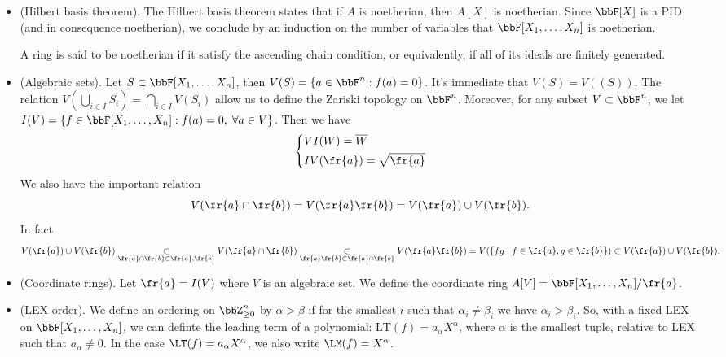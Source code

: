 \begin{itemize}
    \item(Hilbert basis theorem). The Hilbert basis theorem states that if $A$ is noetherian, then $A[X]$ is noetherian. 
    Since $\bbF[X]$ is a PID (and in consequence noetherian), we conclude by an induction on the number of variables that 
    $\bbF[X_1,\dots, X_n]$ is noetherian. 

    \begin{remark}
        A ring is said to be noetherian if it satisfy the ascending chain condition, or equivalently, 
         if all of its ideals are finitely generated.
    \end{remark}
    \item(Algebraic sets). Let $S \subset \bbF[X_1,\dots, X_n]$, then $V(S) = \{a\in\bbF^n: f(a)=0\}$. It's 
    immediate that $V(S) = V((S))$. The relation $V(\bigcup_{i\in I}S_i)=\bigcap_{i\in I}V(S_i)$ allow us 
    to define the Zariski topology on $\bbF^n$. 
    Moreover, for any subset $V\subset \bbF^n$, we let 
    $I(V)=\{f\in\bbF[X_1,\dots,X_n]: f(a)=0,\;\forall a\in V\}$. Then we have 
    \begin{equation}
       \left\{ \begin{aligned}
            &VI(W) = \overline{W}\\
            &IV(\fr{a}) = \sqrt{\fr{a}}
        \end{aligned}\right.
    \end{equation}
    We also have the important relation
    \begin{equation}
        V(\fr{a}\cap\fr{b}) = V(\fr{a}\fr{b}) = V(\fr{a})\cup V(\fr{b}).
    \end{equation}
    In fact 
    \begin{equation}
        V(\fr{a})\cup V(\fr{b})\underset{\fr{a}\cap\fr{b}\subset \fr{a},\fr{b}}{\subset}
        V(\fr{a}\cap\fr{b})\underset{\fr{a}\fr{b}\subset\fr{a}\cap\fr{b}}{\subset}V(\fr{a}\fr{b})
        =V(\{fg:f\in\fr{a},g\in\fr{b}\})\subset V(\fr{a})\cup V(\fr{b}).
    \end{equation}

    \item(Coordinate rings). Let $\fr{a} = I(V)$ where $V$ is an algebraic set. We define the coordinate ring 
    $A[V] = \bbF[X_1,\dots, X_n]/\fr{a}$.

    \item(LEX order). We define an ordering on $\bbZ_{\geq0}^n$ by $\alpha > \beta$ if 
    for the smallest $i$ such that $\alpha_i\neq \beta_i$ we have $\alpha_i > \beta_i$. So, with a 
    fixed LEX on $\bbF[X_1,\dots, X_n]$, we can definte the leading term of a polynomial: 
    $\text{LT}(f) = a_\alpha X^\alpha$, where $\alpha$ is the smallest tuple, relative to LEX such that 
    $a_\alpha\neq0$. In the case $\LT(f) = a_\alpha X^\alpha$, we also write $\LM(f) =X^\alpha$.


\end{itemize}
